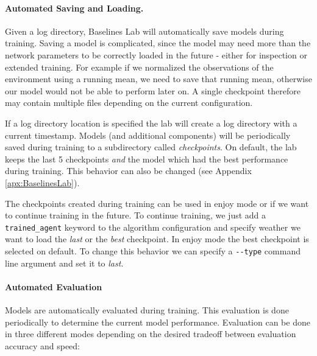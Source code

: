 \paragraph{Automated Saving and Loading.}
Given a log directory, Baselines Lab will automatically save models during training. Saving a model is complicated, since the model may need more than the network parameters to be correctly loaded in the future - either for inspection or extended training. For example if we normalized the observations of the environment using a running mean, we need to save that running mean, otherwise our model would not be able to perform later on. A single checkpoint therefore may contain multiple files depending on the current configuration.

If a log directory location is specified the lab will create a log directory with a current timestamp. Models (and additional components) will be periodically saved during training to a subdirectory called \textit{checkpoints}. On default, the lab keeps the last 5 checkpoints \textit{and} the model which had the best performance during training. This behavior can also be changed (see Appendix \ref{apx:BaselinesLab}).

The checkpoints created during training can be used in enjoy mode or if we want to continue training in the future. To continue training, we just add a \texttt{trained\_agent} keyword to the algorithm configuration and specify weather we want to load the \textit{last} or the \textit{best} checkpoint. In enjoy mode the best checkpoint is selected on default. To change this behavior we can specify a \texttt{-{}-type} command line argument and set it to \textit{last}.

\paragraph{Automated Evaluation}
Models are automatically evaluated during training. This evaluation is done periodically to determine the current model performance. Evaluation can be done in three different modes depending on the desired tradeoff between evaluation accuracy and speed:

